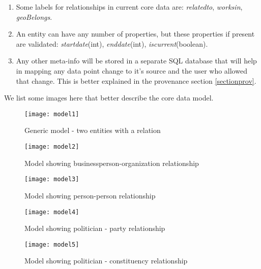 \begin {enumerate}
\item  Some labels for relationships in current core data are: \emph{relatedto}, \emph{worksin}, \emph{geoBelongs}.

\item An entity can have any number of properties, but these properties if present are validated: \emph{startdate}(int), \emph{enddate}(int), \emph{iscurrent}(boolean).

\item Any other meta-info will be stored in a separate SQL database that will help in mapping any data point change to it's source and the user who allowed that change. This is better explained in the provenance section \ref{sectionprov}.

\end{enumerate}

We list some images here that better describe the core data model. 

\begin{figure}[H]
\begin{center}	
\texttt{[image: model1]} 
\caption{Generic model - two entities with a relation}
\label{fig:model1}
\end{center}
\end{figure}

\begin{figure}[H]
\begin{center}	
\texttt{[image: model2]} 
\caption{Model showing businessperson-organization relationship }
\label{fig:model2}
\end{center}
\end{figure}

\begin{figure}[H]
\begin{center}	
\texttt{[image: model3]} 
\caption{Model showing person-person relationship}
\label{fig:model3}
\end{center}
\end{figure}

\begin{figure}[H]
\begin{center}	
\texttt{[image: model4]} 
\caption{Model showing politician - party relationship }
\label{fig:model4}
\end{center}
\end{figure}

\begin{figure}[H]
\begin{center}	
\texttt{[image: model5]} 
\caption{Model showing politician  - constituency relationship}
\label{fig:model5}
\end{center}
\end{figure}

